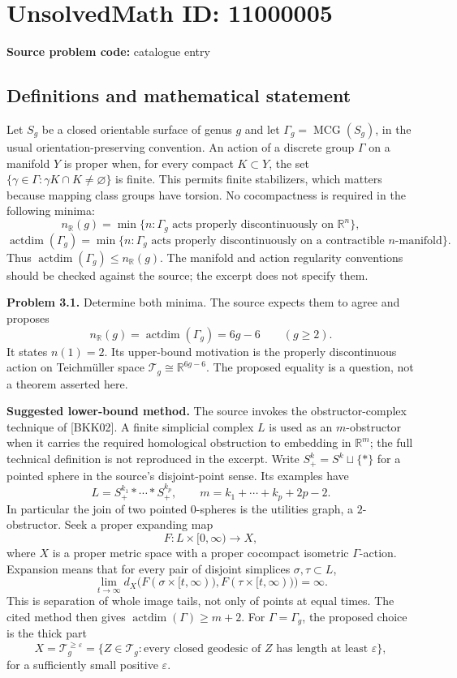 \documentclass[11pt]{article}
\newcommand{\R}{\mathbb{R}}
\newcommand{\eps}{\varepsilon}
\begin{document}
\section*{UnsolvedMath ID: 11000005}
\textbf{Source problem code:} catalogue entry
\subsection{Definitions and mathematical statement}
Let $S_g$ be a closed orientable surface of genus $g$ and let $\Gamma_g=\operatorname{MCG}(S_g)$, in the usual orientation-preserving convention. An action of a discrete group $\Gamma$ on a manifold $Y$ is proper when, for every compact $K\subset Y$, the set $\{\gamma\in\Gamma:\gamma K\cap K\ne\varnothing\}$ is finite. This permits finite stabilizers, which matters because mapping class groups have torsion. No cocompactness is required in the following minima:
\[
 n_{\R}(g)=\min\{n:\Gamma_g\text{ acts properly discontinuously on }\R^n\},
\]
\[
 \operatorname{actdim}(\Gamma_g)=\min\{n:\Gamma_g\text{ acts properly discontinuously on a contractible }n\text{-manifold}\}.
\]
Thus $\operatorname{actdim}(\Gamma_g)\le n_{\R}(g)$. The manifold and action regularity conventions should be checked against the source; the excerpt does not specify them.

\textbf{Problem 3.1.} Determine both minima. The source expects them to agree and proposes
\[
 n_{\R}(g)=\operatorname{actdim}(\Gamma_g)=6g-6\qquad(g\ge2).
\]
It states $n(1)=2$. Its upper-bound motivation is the properly discontinuous action on Teichm\"uller space $\mathcal T_g\cong\R^{6g-6}$. The proposed equality is a question, not a theorem asserted here.

\textbf{Suggested lower-bound method.} The source invokes the obstructor-complex technique of [BKK02]. A finite simplicial complex $L$ is used as an $m$-obstructor when it carries the required homological obstruction to embedding in $\R^m$; the full technical definition is not reproduced in the excerpt. Write $S^k_+=S^k\sqcup\{*\}$ for a pointed sphere in the source's disjoint-point sense. Its examples have
\[
 L=S^{k_1}_+*\cdots*S^{k_p}_+,\qquad
 m=k_1+\cdots+k_p+2p-2.
\]
In particular the join of two pointed $0$-spheres is the utilities graph, a $2$-obstructor. Seek a proper expanding map
\[
 F:L\times[0,\infty)\longrightarrow X,
\]
where $X$ is a proper metric space with a proper cocompact isometric $\Gamma$-action. Expansion means that for every pair of disjoint simplices $\sigma,\tau\subset L$,
\[
 \lim_{t\to\infty}d_X\bigl(F(\sigma\times[t,\infty)),F(\tau\times[t,\infty))\bigr)=\infty.
\]
This is separation of whole image tails, not only of points at equal times. The cited method then gives $\operatorname{actdim}(\Gamma)\ge m+2$. For $\Gamma=\Gamma_g$, the proposed choice is the thick part
\[
 X=\mathcal T_g^{\ge\eps}=\{Z\in\mathcal T_g:\text{every closed geodesic of }Z\text{ has length at least }\eps\},
\]
for a sufficiently small positive $\eps$.
\end{document}
